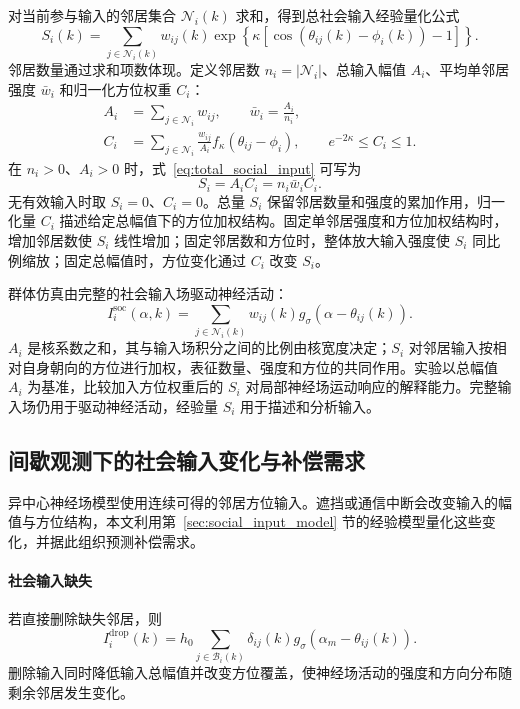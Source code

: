 \documentclass[UTF8,fontset=windows,11pt]{ctexart}
\begin{document}
对当前参与输入的邻居集合 $\mathcal N_i(k)$ 求和，得到总社会输入经验量化公式
\begin{equation}
 \boxed{\displaystyle S_i(k)=\sum_{j\in\mathcal N_i(k)}w_{ij}(k)
 \exp\!\left\{\kappa\left[\cos(\theta_{ij}(k)-\phi_i(k))-1\right]\right\}.}
 \label{eq:total_social_input}
\end{equation}
邻居数量通过求和项数体现。定义邻居数 $n_i=|\mathcal N_i|$、总输入幅值 $A_i$、平均单邻居强度 $\bar w_i$ 和归一化方位权重 $C_i$：
\begin{align}
 A_i&=\sum_{j\in\mathcal N_i}w_{ij},\qquad
 \bar w_i=\frac{A_i}{n_i},\\
 C_i&=\sum_{j\in\mathcal N_i}\frac{w_{ij}}{A_i}
 f_\kappa(\theta_{ij}-\phi_i),\qquad e^{-2\kappa}\leq C_i\leq1.
\end{align}
在 $n_i>0$、$A_i>0$ 时，式~\eqref{eq:total_social_input} 可写为
\begin{equation}
 \boxed{S_i=A_iC_i=n_i\bar w_iC_i.}
 \label{eq:social_factorization}
\end{equation}
无有效输入时取 $S_i=0$、$C_i=0$。总量 $S_i$ 保留邻居数量和强度的累加作用，归一化量 $C_i$ 描述给定总幅值下的方位加权结构。固定单邻居强度和方位加权结构时，增加邻居数使 $S_i$ 线性增加；固定邻居数和方位时，整体放大输入强度使 $S_i$ 同比例缩放；固定总幅值时，方位变化通过 $C_i$ 改变 $S_i$。

群体仿真由完整的社会输入场驱动神经活动：
\begin{equation}
 I_i^{\mathrm{soc}}(\alpha,k)=\sum_{j\in\mathcal N_i(k)}w_{ij}(k)
 g_\sigma(\alpha-\theta_{ij}(k)).
\end{equation}
$A_i$ 是核系数之和，其与输入场积分之间的比例由核宽度决定；$S_i$ 对邻居输入按相对自身朝向的方位进行加权，表征数量、强度和方位的共同作用。实验以总幅值 $A_i$ 为基准，比较加入方位权重后的 $S_i$ 对局部神经场运动响应的解释能力。完整输入场仍用于驱动神经活动，经验量 $S_i$ 用于描述和分析输入。

\subsection{间歇观测下的社会输入变化与补偿需求}

异中心神经场模型使用连续可得的邻居方位输入。遮挡或通信中断会改变输入的幅值与方位结构，本文利用第~\ref{sec:social_input_model} 节的经验模型量化这些变化，并据此组织预测补偿需求。

\paragraph{社会输入缺失}
若直接删除缺失邻居，则
\begin{equation}
 I_i^{\mathrm{drop}}(k)=
 h_0\sum_{j\in\mathcal B_i(k)}\delta_{ij}(k)
 g_\sigma(\alpha_m-\theta_{ij}(k)).
\end{equation}
删除输入同时降低输入总幅值并改变方位覆盖，使神经场活动的强度和方向分布随剩余邻居发生变化。
\end{document}
